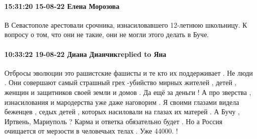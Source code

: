  
 
 
 
 

\paragraph{15:31:20 15-08-22 Елена Морозова}

В Севастополе арестовали срочника, изнасиловавшего 12-летнюю школьницу.
К вопросу о том, что они не такие, они не могли этого делать в Буче.

\paragraph{10:33:22 19-08-22 Диана Дианчикreplied to Яна}

Отбросы эволюции это рашистские фашисты и те кто их поддерживает . Не люди .
Они совершают самый страшный грех -убийство мирных жителей , детей , женщин и
защитников своей земли и домов . Да ещё за деньги ! А про зверства ,
изнасилования и мародерства уже даже наговорим . Я своими глазами видела
беженцев , седых детей , которых насиловали на глазах их матерей . А Бучу ,
Иртвень, Мариуполь ? Карма и ответка обязательно будет . Но а Россия очищается
от мерзости в человечьих телах . Уже 44000. !
